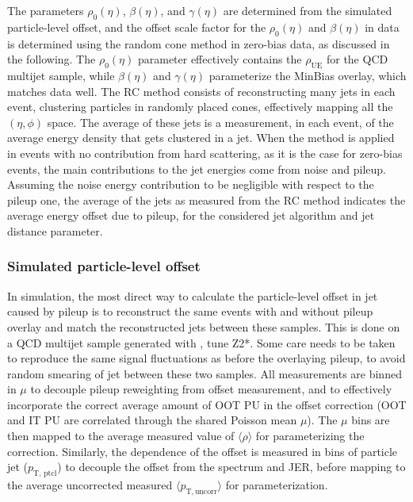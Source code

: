 \documentclass[11pt,twoside,a4paper,cmspaper,final,collab]{cms-tdr}
\begin{document}
The parameters $\rho_0(\eta)$, $\beta(\eta)$, and $\gamma(\eta)$ are determined from the simulated particle-level offset, and the offset scale factor for the $\rho_0(\eta)$ and $\beta(\eta)$ in data is determined using the random cone method in zero-bias data, as discussed in the following.
The $\rho_0(\eta)$ parameter effectively contains the $\rho_\mathrm{UE}$ for the QCD multijet sample, while $\beta(\eta)$ and $\gamma(\eta)$ parameterize the  MinBias overlay, which matches data well.
The RC method consists of reconstructing many jets in each event, clustering particles in randomly placed cones, effectively mapping all the $(\eta,\phi)$ space. The average \pt of these jets is a measurement, in each event, of the average energy density that gets clustered in a jet. When the method is applied in events with no contribution from hard scattering, as it is the case for zero-bias events, the main contributions to the jet energies come from noise and pileup. Assuming the noise energy contribution to be negligible with respect to the pileup one, the average \pt of the jets as measured from the RC method indicates the average energy offset due to pileup, for the considered jet algorithm and jet distance parameter.

\subsubsection*{Simulated particle-level offset}\label{sec:pumc}

In simulation, the most direct way to calculate the particle-level offset in jet \pt caused by pileup is to reconstruct the same events with and without pileup overlay and match the reconstructed jets between these samples. This is done on a QCD multijet sample generated with , tune Z2*.
Some care needs to be taken to reproduce the same signal fluctuations as before the overlaying pileup, to avoid random smearing of jet \pt between these two samples.
All measurements are binned in $\mu$ to decouple pileup reweighting from offset measurement, and to effectively incorporate the correct average amount of OOT PU in the offset correction (OOT and IT PU are correlated through the shared Poisson mean $\mu$). The $\mu$ bins are then mapped to the average measured value of $\langle\rho\rangle$ for parameterizing the correction. Similarly, the \pt dependence of the offset is measured in bins of particle jet \pt ($p_\text{T, ptcl}$) to decouple the offset from the \pt spectrum and JER, before mapping to the average uncorrected measured $\langle p_\mathrm{T, uncorr}\rangle$ for parameterization.
\end{document}
